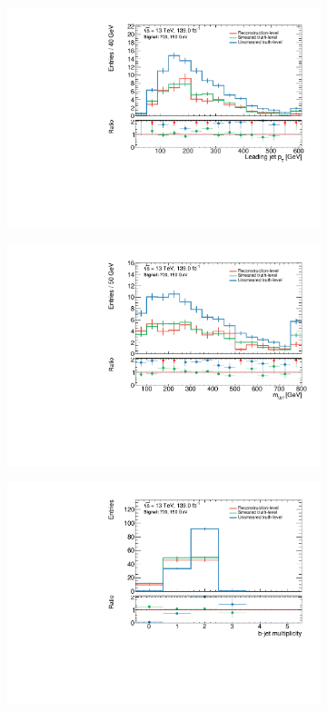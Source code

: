 \begin{figure}
\begin{subfigure}[b]{0.45\linewidth}
		\centering\includegraphics[width=\textwidth]{jet1Pt_C1N2_Wh_hbb_700p0_150p0_smeared.pdf}
	\end{subfigure}\hfill
	\begin{subfigure}[b]{0.45\linewidth}
		\centering\includegraphics[width=\textwidth]{mlb1_C1N2_Wh_hbb_700p0_150p0_smeared.pdf}
	\end{subfigure}\hfill
	\begin{subfigure}[b]{0.45\linewidth}
		\centering\includegraphics[width=\textwidth]{nBJet30_C1N2_Wh_hbb_700p0_150p0_smeared.pdf}

\end{subfigure}
\end{figure}
